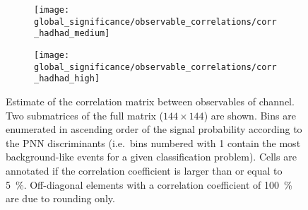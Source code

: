 \begin{figure}[htbp]
  \centering

  \begin{subfigure}{\textwidth}
    \centering

    \texttt{[image: global\_significance/observable\_correlations/corr\_hadhad\_medium]}
    \label{fig:correlation_matrix_observables_medium}
  \end{subfigure}

  \begin{subfigure}{\textwidth}
    \centering

    \texttt{[image: global\_significance/observable\_correlations/corr\_hadhad\_high]}
    \label{fig:correlation_matrix_observables_high}
  \end{subfigure}

  \caption{Estimate of the correlation matrix between observables of
    \hadhad channel. Two submatrices of the full matrix
    ($144 \times 144$) are shown. Bins are enumerated in ascending
    order of the signal probability according to the PNN discriminants
    (i.e.\ bins numbered with 1 contain the most background-like
    events for a given classification problem).  Cells are annotated
    if the correlation coefficient is larger than or equal to
    \SI{5}{\percent}. Off-diagonal elements with a correlation
    coefficient of \SI{100}{\percent} are due to rounding only.}%
  \label{fig:correlation_matrix_observables}
\end{figure}

